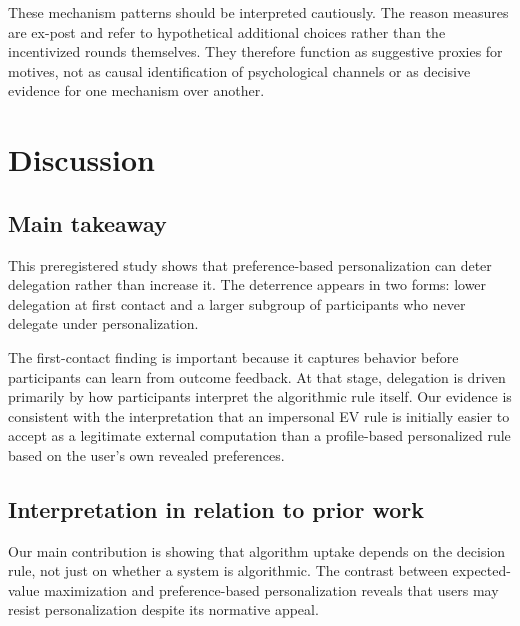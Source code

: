 \documentclass[a4paper, 12pt, fleqn]{article}
\theoremstyle{definition}
\begin{document}
These mechanism patterns should be interpreted cautiously. The reason measures are ex-post and refer to hypothetical additional choices rather than the incentivized rounds themselves. They therefore function as suggestive proxies for motives, not as causal identification of psychological channels or as decisive evidence for one mechanism over another.







\section{Discussion}
\label{sec:discussion}

\subsection{Main takeaway}
This preregistered study shows that preference-based personalization can deter delegation rather than increase it. The deterrence appears in two forms: lower delegation at first contact and a larger subgroup of participants who never delegate under personalization.

The first-contact finding is important because it captures behavior before participants can learn from outcome feedback. At that stage, delegation is driven primarily by how participants interpret the algorithmic rule itself. Our evidence is consistent with the interpretation that an impersonal EV rule is initially easier to accept as a legitimate external computation than a profile-based personalized rule based on the user's own revealed preferences.

\subsection{Interpretation in relation to prior work}
Our main contribution is showing that algorithm uptake depends on the decision rule, not just on whether a system is algorithmic. The contrast between expected-value maximization and preference-based personalization reveals that users may resist personalization despite its normative appeal.
\end{document}
